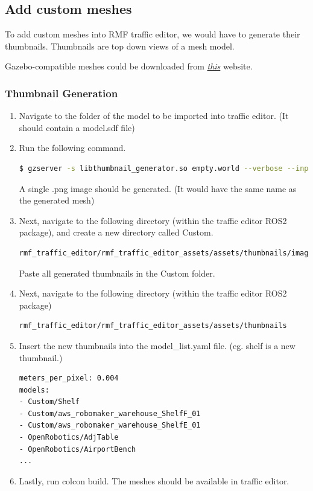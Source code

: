 \documentclass[11pt]{article}
\begin{document}
\subsection{Add custom meshes}
To add custom meshes into RMF traffic editor, we would have to generate their thumbnails. Thumbnails are top down views of a mesh model.

Gazebo-compatible meshes could be downloaded from \href{https://app.gazebosim.org/dashboard}{\emph{this}} website.
\subsubsection{Thumbnail Generation}
\begin{enumerate}
 \item {
       Navigate to the folder of the model to be imported into traffic editor. (It should contain a model.sdf file)
       }
 \item {
       Run the following command.
       \begin{lstlisting}[language=bash]
         $ gzserver -s libthumbnail_generator.so empty.world --verbose --input <model filepath>/model.sdf --output .
        \end{lstlisting}
       A single .png image should be generated. (It would have the same name as the generated mesh)
       }
 \item {
       Next, navigate to the following directory (within the traffic editor ROS2 package), and create a new directory called Custom.
       \begin{lstlisting}[language=bash]
rmf_traffic_editor/rmf_traffic_editor_assets/assets/thumbnails/images/cropped
        \end{lstlisting}
       }
       Paste all generated thumbnails in the Custom folder.
 \item  {
       Next, navigate to the following directory (within the traffic editor ROS2 package)
       \begin{lstlisting}[language=bash]
rmf_traffic_editor/rmf_traffic_editor_assets/assets/thumbnails
        \end{lstlisting}
       }
 \item {
       Insert the new thumbnails into the model\_list.yaml file. (eg. shelf is a new thumbnail.)
       \begin{lstlisting}[language=bash]
  meters_per_pixel: 0.004
models:
- Custom/Shelf
- Custom/aws_robomaker_warehouse_ShelfF_01
- Custom/aws_robomaker_warehouse_ShelfE_01
- OpenRobotics/AdjTable
- OpenRobotics/AirportBench
...
  \end{lstlisting}
       }
 \item {
       Lastly, run colcon build. The meshes should be available in traffic editor.
       }
\end{enumerate}
\end{document}
